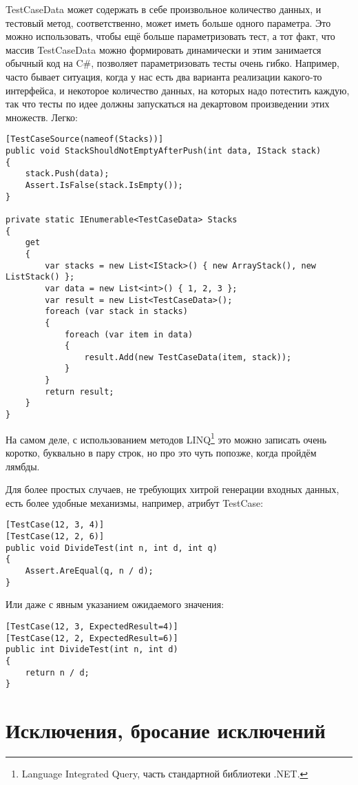 \documentclass[a5paper]{article}
\begin{document}
TestCaseData может содержать в себе произвольное количество данных, и тестовый метод, соответственно, может иметь больше одного параметра. Это можно использовать, чтобы ещё больше параметризовать тест, а тот факт, что массив TestCaseData можно формировать динамически и этим занимается обычный код на C\#, позволяет параметризовать тесты очень гибко. Например, часто бывает ситуация, когда у нас есть два варианта реализации какого-то интерфейса, и некоторое количество данных, на которых надо потестить каждую, так что тесты по идее должны запускаться на декартовом произведении этих множеств. Легко:

\begin{verbatim}
[TestCaseSource(nameof(Stacks))]
public void StackShouldNotEmptyAfterPush(int data, IStack stack)
{
    stack.Push(data);
    Assert.IsFalse(stack.IsEmpty());
}

private static IEnumerable<TestCaseData> Stacks 
{
    get
    {
        var stacks = new List<IStack>() { new ArrayStack(), new ListStack() };
        var data = new List<int>() { 1, 2, 3 };
        var result = new List<TestCaseData>();
        foreach (var stack in stacks)
        {
            foreach (var item in data)
            {
                result.Add(new TestCaseData(item, stack));
            }
        }
        return result;
    }
}
\end{verbatim}

На самом деле, с использованием методов LINQ\footnote{Language Integrated Query, часть стандартной библиотеки .NET.} это можно записать очень коротко, буквально в пару строк, но про это чуть попозже, когда пройдём лямбды.

Для более простых случаев, не требующих хитрой генерации входных данных, есть более удобные механизмы, например, атрибут TestCase:

\begin{verbatim}
[TestCase(12, 3, 4)]
[TestCase(12, 2, 6)]
public void DivideTest(int n, int d, int q)
{
    Assert.AreEqual(q, n / d);
}
\end{verbatim}

Или даже с явным указанием ожидаемого значения:

\begin{verbatim}
[TestCase(12, 3, ExpectedResult=4)]
[TestCase(12, 2, ExpectedResult=6)]
public int DivideTest(int n, int d)
{
    return n / d;
}
\end{verbatim}

\section{Исключения, бросание исключений}
\end{document}
